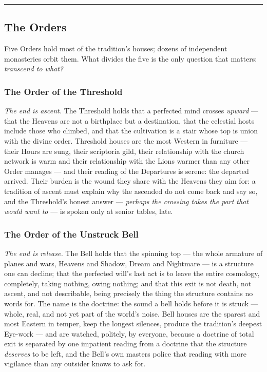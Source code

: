 \medskip\hrule\medskip

\subsection{The Orders}

Five Orders hold most of the tradition's houses; dozens of independent monasteries orbit them. What divides the five is the only question that matters: \textit{transcend to what?}

\subsubsection{The Order of the Threshold}

\textit{The end is ascent.} The Threshold holds that a perfected mind crosses \textit{upward} --- that the Heavens are not a birthplace but a destination, that the celestial hosts include those who climbed, and that the cultivation is a stair whose top is union with the divine order. Threshold houses are the most Western in furniture --- their Hours are sung, their scriptoria gild, their relationship with the church network is warm and their relationship with the Lions warmer than any other Order manages --- and their reading of the Departures is serene: the departed arrived. Their burden is the wound they share with the Heavens they aim for: a tradition of ascent must explain why the ascended do not come back and say so, and the Threshold's honest answer --- \textit{perhaps the crossing takes the part that would want to} --- is spoken only at senior tables, late.

\subsubsection{The Order of the Unstruck Bell}

\textit{The end is release.} The Bell holds that the spinning top --- the whole armature of planes and wars, Heavens and Shadow, Dream and Nightmare --- is a structure one can decline; that the perfected will's last act is to leave the entire cosmology, completely, taking nothing, owing nothing; and that this exit is not death, not ascent, and not describable, being precisely the thing the structure contains no words for. The name is the doctrine: the sound a bell holds before it is struck --- whole, real, and not yet part of the world's noise. Bell houses are the sparest and most Eastern in temper, keep the longest silences, produce the tradition's deepest Eye-work --- and are watched, politely, by everyone, because a doctrine of total exit is separated by one impatient reading from a doctrine that the structure \textit{deserves} to be left, and the Bell's own masters police that reading with more vigilance than any outsider knows to ask for.

